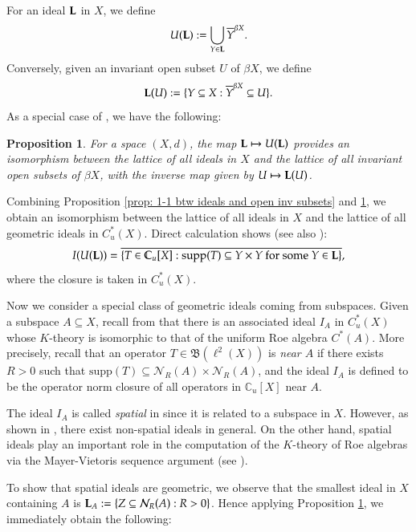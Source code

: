 \documentclass[12pt, a4paper]{amsart}
\numberwithin{equation}{section}
\newtheorem{prop}[thm]{Proposition}
\theoremstyle{definition}
\theoremstyle{remark}
\def\CC{\mathbb{C}}
\def\L{\mathcal{L}}
\def\Nd{\mathcal{N}}
\def\B{\mathfrak{B}}
\def\supp{\mathrm{supp}}
\def\L{{\bf L}}
\begin{document}
For an ideal $\L$ in $X$, we define
\[
U(\L):= \bigcup_{Y \in \L} \overline{Y}^{\beta X}.
\]
Conversely, given an invariant open subset $U$ of $\beta X$, we define
\[
\L(U):=\{Y \subseteq X: \overline{Y}^{\beta X} \subseteq U\}.
\]
As a special case of \cite[Theorem 6.3]{CW04}, we have the following:

\begin{prop}\label{prop: 1-1 btw ideals in spaces and open inv subsets}
For a space $(X,d)$, the map $\L \mapsto U(\L)$ provides an isomorphism between the lattice of all ideals in $X$ and the lattice of all invariant open subsets of $\beta X$, with the inverse map given by $U \mapsto \L(U)$.
\end{prop}


Combining Proposition \ref{prop: 1-1 btw ideals and open inv subsets} and \ref{prop: 1-1 btw ideals in spaces and open inv subsets}, we obtain an isomorphism between the lattice of all ideals in $X$ and the lattice of all geometric ideals in $C^*_u(X)$. Direct calculation shows (see also \cite[Theorem 6.4]{CW04}):
\begin{equation}\label{EQ: I(U(L))}
I(U(\L))=\overline{\{T \in \CC_u[X]: \supp(T) \subseteq Y \times Y \mbox{~for~some~}Y \in \L\}},
\end{equation}
where the closure is taken in $C^*_u(X)$.


Now we consider a special class of geometric ideals coming from subspaces. Given a subspace $A \subseteq X$, recall from \cite[Section 5]{HRY93} that there is an associated ideal $I_A$ in $C^*_u(X)$ whose $K$-theory is isomorphic to that of the uniform Roe algebra $C^*(A)$. More precisely, recall that an operator $T \in \B(\ell^2(X))$ is \emph{near $A$} if there exists $R>0$ such that $\supp(T) \subseteq \Nd_R(A) \times \Nd_R(A)$, and the ideal $I_A$ is defined to be the operator norm closure of all operators in $\CC_u[X]$ near $A$.

The ideal $I_A$ is called \emph{spatial} in \cite{CW04b} since it is related to a subspace in $X$. However, as shown in \cite[Example 2.1]{CW04b}, there exist non-spatial ideals in general. On the other hand, spatial ideals play an important role in the computation of the $K$-theory of Roe algebras via the Mayer-Vietoris sequence argument (see \cite{HRY93}).

To show that spatial ideals are geometric, we observe that the smallest ideal in $X$ containing $A$ is $\L_A:=\{Z \subseteq \Nd_R(A): R>0\}$. Hence applying Proposition \ref{prop: 1-1 btw ideals in spaces and open inv subsets}, we immediately obtain the following:
\end{document}
